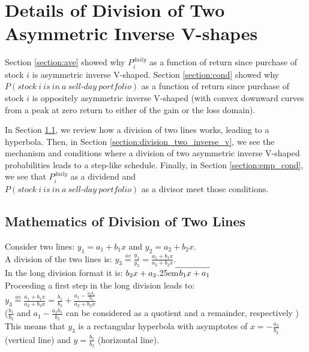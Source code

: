 \documentclass[11pt, a4paper]{article}
\newcommand\LongDiv[2]{%
	$\strut#1$\kern.25em\smash{\raise.3ex\hbox{$\big)$}}$\mkern-8mu
	\overline{\enspace\strut#2}$}
\begin{document}
\section{Details of Division of Two Asymmetric Inverse V-shapes}
\label{section:condition}
Section \ref{section:ave} showed why $P^{daily}_{i}$ as a function of return since purchase of stock $i$ is asymmetric inverse V-shaped. Section \ref{section:cond} showed why $P(stock~i~is~in~a~sell\mbox{-}day~portfolio)$ as a function of return since purchase of stock $i$ is oppositely asymmetric inverse V-shaped (with convex downward curves from a peak at zero return to either of the gain or the loss domain).

In Section \ref{section:division_two_lines}, we review how a division of two lines works, leading to a hyperbola. Then, in Section \ref{section:division_two_inverse_v}, we see the mechanism and conditions where a division of two asymmetric inverse V-shaped probabilities leads to a step-like schedule. Finally, in Section \ref{section:emp_cond}, we see that $P^{daily}_{i}$ as a dividend and\\ $P(stock~i~is~in~a~sell\mbox{-}day~portfolio)$ as a divisor meet those conditions.

\subsection{Mathematics of Division of Two Lines}
\label{section:division_two_lines}
Consider two lines: $y_1=a_1+b_1x$ and $y_2=a_2+b_2x$.\\

\noindent
A division of the two lines is: $y_3 \overset{\underset{\mathrm{def}}{}}{=} \frac{y_1}{y_2}=\frac{a_1+b_1x}{a_2+b_2x}$.\\

\noindent
In the long division format it is: \LongDiv{b_2x+a_2}{b_1x+a_1}\\

\noindent
Proceeding a first step in the long division leads to:\\
$y_3 \overset{\underset{\mathrm{def}}{}}{=} \frac{a_1+b_1x}{a_2+b_2x}=\frac{b_1}{b_2}+\frac{a_1-\frac{a_2 b_1}{b_2}}{a_2+b_2x}$\\
($\frac{b_1}{b_2}$ and $a_1{\scriptstyle -}\frac{a_2 b_1}{b_2}$ can be considered as a quotient and a remainder, respectively )\\

\noindent
This means that $y_3$ is a rectangular hyperbola with asymptotes of $x=-\frac{a_2}{b_2}$ (vertical line) and $y=\frac{b_1}{b_2}$ (horizontal line). \\
\end{document}
